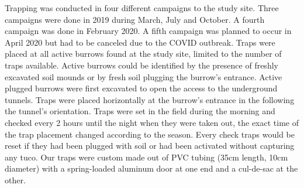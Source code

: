 \documentclass[msc,numbers,hidelinks]{coppe}
\begin{document}
  Trapping was conducted in four different campaigns to the study site. Three campaigns were done in 2019 during March, July and October. A fourth campaign was done in February 2020. A fifth campaign was planned to occur in April 2020 but had to be canceled due to the COVID outbreak. Traps were placed at all active burrows found at the study site, limited to the number of traps available. Active burrows could be identified by the presence of freshly excavated soil mounds or by fresh soil plugging the burrow's entrance. Active plugged burrows were first excavated to open the access to the underground tunnels. Traps were placed horizontally at the burrow's entrance in the following the tunnel's orientation. Traps were set in the field during the morning and checked every 2 hours until the night when they were taken out, the exact time of the trap placement changed according to the season. Every check traps would be reset if they had been plugged with soil or had been activated without capturing any tuco. Our traps were custom made out of PVC tubing (35cm length, 10cm diameter) with a spring-loaded aluminum door at one end and a cul-de-sac at the other.
\end{document}
